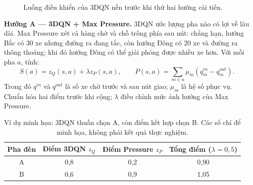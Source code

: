 \documentclass[11pt,a4paper,headings=small,parskip=half]{scrartcl}
\begin{document}
\begin{figure}[H]\centering
{}
\caption{Luồng điều khiển của 3DQN nền trước khi thử hai hướng cải tiến.}
\end{figure}

\newpage
\textbf{Hướng A — 3DQN + Max Pressure.} 3DQN ước lượng pha nào có lợi về lâu dài. Max Pressure xét cả hàng chờ và chỗ trống phía sau nút: chẳng hạn, hướng Bắc có 30 xe nhưng đường ra đang tắc, còn hướng Đông có 20 xe và đường ra thông thoáng; khi đó hướng Đông có thể giải phóng được nhiều xe hơn. Với mỗi pha $a$, tính:
\[
S(a)=z_Q(s,a)+\lambda z_P(s,a), \qquad
P(s,a)=\sum_{m\in a}\mu_m(q_m^{in}-q_m^{out}).
\]
Trong đó $q^{in}$ và $q^{out}$ là số xe chờ trước và sau nút giao; $\mu_m$ là hệ số phục vụ. Chuẩn hóa hai điểm trước khi cộng; $\lambda$ điều chỉnh mức ảnh hưởng của Max Pressure.

\begin{table}[H]\centering\small
\begin{tabular}{c c c c}
\toprule Pha đèn & Điểm 3DQN $z_Q$ & Điểm Pressure $z_P$ & Tổng điểm ($\lambda=0{,}5$) \\ \midrule
A & 0,8 & 0,2 & 0,90 \\
B & 0,6 & 0,9 & 1,05 \\
\bottomrule
\end{tabular}
\caption{Ví dụ minh họa: 3DQN thuần chọn A, còn điểm kết hợp chọn B. Các số chỉ để minh họa, không phải kết quả thực nghiệm.}
\end{table}
\end{document}
